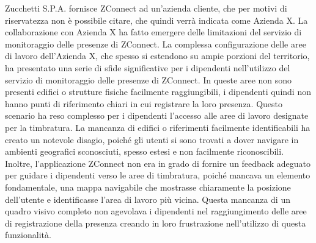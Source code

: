 Zucchetti S.P.A. fornisce ZConnect ad un'azienda cliente, che per motivi di riservatezza non è possibile citare, che quindi verrà indicata come Azienda X. La collaborazione con Azienda X ha fatto emergere delle limitazioni del servizio di monitoraggio delle presenze di ZConnect.
La complessa configurazione delle aree di lavoro dell'Azienda X, che spesso si estendono su ampie porzioni del territorio, ha presentato una serie di sfide significative per i dipendenti nell'utilizzo del servizio di monitoraggio delle presenze di ZConnect. In queste aree non sono presenti edifici o strutture fisiche facilmente raggiungibili, i dipendenti quindi non hanno punti di riferimento chiari in cui registrare la loro presenza.
Questo scenario ha reso complesso per i dipendenti l'accesso alle aree di lavoro designate per la timbratura. La mancanza di edifici o riferimenti facilmente identificabili ha creato un notevole disagio, poiché gli utenti si sono trovati a dover navigare in ambienti geografici sconosciuti, spesso estesi e non facilmente riconoscibili.
Inoltre, l'applicazione ZConnect non era in grado di fornire un feedback adeguato per guidare i dipendenti verso le aree di timbratura, poiché mancava un elemento fondamentale, una mappa navigabile che mostrasse chiaramente la posizione dell'utente e identificasse l'area di lavoro più vicina. Questa mancanza di un quadro visivo completo non agevolava i dipendenti nel raggiungimento delle aree di registrazione della presenza creando in loro frustrazione nell'utilizzo di questa funzionalità.

